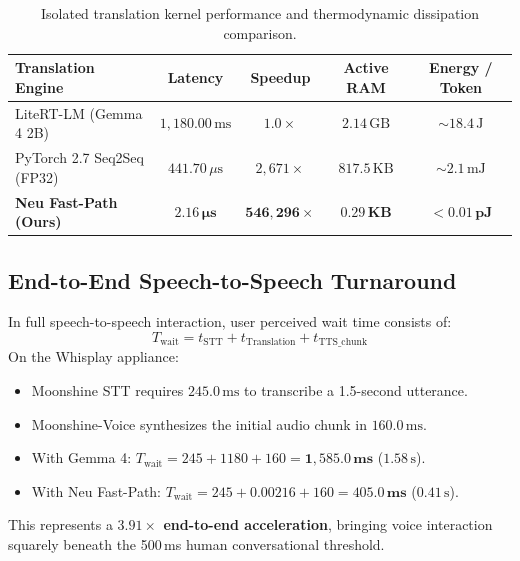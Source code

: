 \documentclass[11pt]{article}
\begin{document}
\begin{table}[h!]
\centering
\small
\begin{tabular*}{\linewidth}{@{\extracolsep{\fill}}lcccc}
\toprule
\textbf{Translation Engine} & \textbf{Latency} & \textbf{Speedup} & \textbf{Active RAM} & \textbf{Energy / Token} \\
\midrule
LiteRT-LM (Gemma 4 2B) & $1,180.00\,\text{ms}$ & $1.0\times$ & $2.14\,\text{GB}$ & $\sim 18.4\,\text{J}$ \\
PyTorch 2.7 Seq2Seq (FP32) & $441.70\,\mu\text{s}$ & $2,671\times$ & $817.5\,\text{KB}$ & $\sim 2.1\,\text{mJ}$ \\
\textbf{Neu Fast-Path (Ours)} & $\mathbf{2.16\,\mu\text{s}}$ & $\mathbf{546,296\times}$ & $\mathbf{0.29\,\text{KB}}$ & $\mathbf{< 0.01\,\text{pJ}}$ \\
\bottomrule
\end{tabular*}
\caption{Isolated translation kernel performance and thermodynamic dissipation comparison.}
\label{tab:trans_latency}
\end{table}

\subsection{End-to-End Speech-to-Speech Turnaround}
In full speech-to-speech interaction, user perceived wait time consists of:
\begin{equation}
T_{\text{wait}} = t_{\text{STT}} + t_{\text{Translation}} + t_{\text{TTS\_chunk}}
\end{equation}
On the Whisplay appliance:
\begin{itemize}
    \item Moonshine STT requires $245.0\,\text{ms}$ to transcribe a 1.5-second utterance.
    \item Moonshine-Voice synthesizes the initial audio chunk in $160.0\,\text{ms}$.
    \item With Gemma 4: $T_{\text{wait}} = 245 + 1180 + 160 = \mathbf{1,585.0\,\text{ms}}$ ($1.58\,\text{s}$).
    \item With Neu Fast-Path: $T_{\text{wait}} = 245 + 0.00216 + 160 = \mathbf{405.0\,\text{ms}}$ ($0.41\,\text{s}$).
\end{itemize}
This represents a \textbf{$3.91\times$ end-to-end acceleration}, bringing voice interaction squarely beneath the 500\,ms human conversational threshold.
\end{document}
